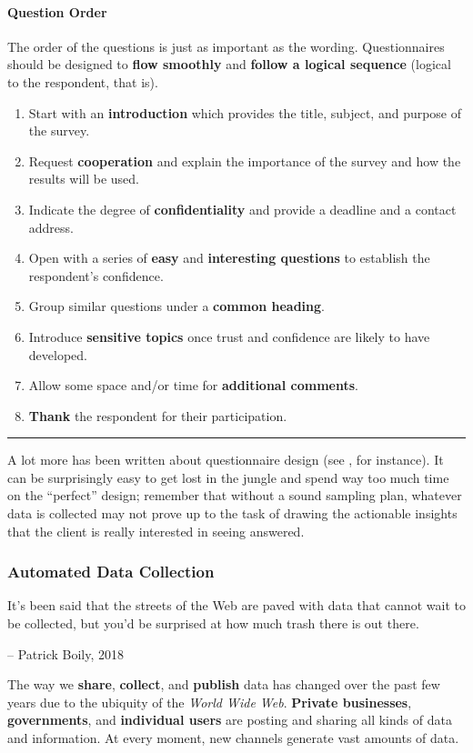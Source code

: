 \paragraph{Question Order} The order of the questions is just as important as the wording. Questionnaires should be designed to \textbf{flow smoothly} and \textbf{follow a logical sequence} (logical to the respondent, that is).  
\begin{enumerate}[noitemsep]
\item Start with an \textbf{introduction} which provides the title, subject, and purpose of the survey.
\item Request \textbf{cooperation} and explain the importance of the survey and how the results will be used.
\item Indicate the degree of \textbf{confidentiality} and provide a deadline and a contact address.
\item Open with a series of \textbf{easy} and \textbf{interesting questions} to establish the respondent's confidence.
\item Group similar questions under a \textbf{common heading}.
\item Introduce \textbf{sensitive topics} once trust and confidence are likely to have developed.
\item Allow some space and/or time for \textbf{additional comments}.
\item \textbf{Thank} the respondent for their participation.
\end{enumerate}
\begin{center}
    \rule{0.5\textwidth}{.4pt}
\end{center}
A lot more has been written about questionnaire design (see \cite{DC_O}, for instance). It can be surprisingly easy to get lost in the jungle and spend way too much time on the ``perfect'' design; remember that without a sound sampling plan, whatever data is collected may not prove up to the task of drawing the actionable insights that the client is really interested in seeing  answered. 
\subsubsection{Automated Data Collection}\label{sec:adc}
\begin{tcolorbox}[title=One Man's Trash...]
It's been said that the streets of the Web are paved with data that cannot wait to be collected, but you'd be surprised at how much trash there is out there. \\[-0.6cm]
\begin{flushright}
-- Patrick Boily, 2018
\end{flushright}
\end{tcolorbox}
\noindent The way we \textbf{share}, \textbf{collect}, and \textbf{publish} data has changed over the past few years due to the ubiquity of the \textit{World Wide Web}. \textbf{Private businesses}, \textbf{governments}, and \textbf{individual users} are posting and sharing all kinds of data and information. At every moment, new channels generate vast amounts of data.


